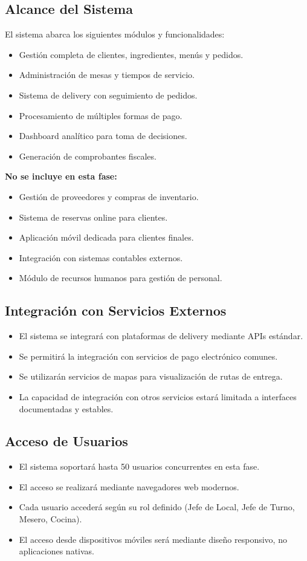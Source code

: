 \documentclass[12pt]{article}
\begin{document}
\subsection{Alcance del Sistema}
El sistema abarca los siguientes módulos y funcionalidades:

\begin{itemize}
  \item Gestión completa de clientes, ingredientes, menús y pedidos.
  \item Administración de mesas y tiempos de servicio.
  \item Sistema de delivery con seguimiento de pedidos.
  \item Procesamiento de múltiples formas de pago.
  \item Dashboard analítico para toma de decisiones.
  \item Generación de comprobantes fiscales.
\end{itemize}

\textbf{No se incluye en esta fase:}
\begin{itemize}
  \item Gestión de proveedores y compras de inventario.
  \item Sistema de reservas online para clientes.
  \item Aplicación móvil dedicada para clientes finales.
  \item Integración con sistemas contables externos.
  \item Módulo de recursos humanos para gestión de personal.
\end{itemize}

\subsection{Integración con Servicios Externos}
\begin{itemize}
  \item El sistema se integrará con plataformas de delivery mediante APIs estándar.
  \item Se permitirá la integración con servicios de pago electrónico comunes.
  \item Se utilizarán servicios de mapas para visualización de rutas de entrega.
  \item La capacidad de integración con otros servicios estará limitada a interfaces documentadas y estables.
\end{itemize}

\subsection{Acceso de Usuarios}
\begin{itemize}
  \item El sistema soportará hasta 50 usuarios concurrentes en esta fase.
  \item El acceso se realizará mediante navegadores web modernos.
  \item Cada usuario accederá según su rol definido (Jefe de Local, Jefe de Turno, Mesero, Cocina).
  \item El acceso desde dispositivos móviles será mediante diseño responsivo, no aplicaciones nativas.
\end{itemize}
\end{document}
